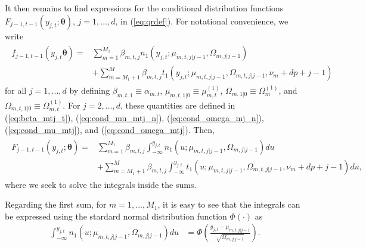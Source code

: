 \documentclass[nojss]{jss}
\begin{document}
\begin{appendix}
It then remains to find expressions for the conditional distribution functions $F_{j-1,t-1}(y_{j,t};\boldsymbol{\theta})$, $j=1,...,d$, in (\ref{eq:qrdef}).  For notational convenience, we write
\begin{align}
\begin{aligned}
f_{j-1,t-1}(y_{j,t}\boldsymbol{\theta}) =& \sum_{m=1}^{M_1}\beta_{m,t,j}n_1(y_{j,t};\mu_{m,t,j|j-1},\Omega_{m,j|j-1}) \\
&+ \sum_{m=M_1 + 1}^{M}\beta_{m,t,j}t_1(y_{j,t};\mu_{m,t,j|j-1},\Omega_{m,t,j|j-1},\nu_m + dp + j - 1)
\end{aligned}
\end{align}
for all $j=1,...,d$ by defining $\beta_{m,t,1}\equiv \alpha_{m,t}$,  $\mu_{m,t,1|0}\equiv \mu_{m,t}^{(1)}$,  $\Omega_{m,1|0}\equiv \Omega_{m}^{(1)}$, and $\Omega_{m,t,1|0}\equiv \Omega_{m,t}^{(1)}$.  For $j=2,...,d$,  these quantities are defined in (\ref{eq:beta_mtj_t}), (\ref{eq:cond_mu_mtj_n}), (\ref{eq:cond_omega_mj_n}), (\ref{eq:cond_mu_mtj}), and (\ref{eq:cond_omega_mtj}). Then,
\begin{align}
\begin{aligned}
F_{j-1,t-1}(y_{j,t};\boldsymbol{\theta})=&\sum_{m=1}^{M_1}\beta_{m,t,j}\int_{-\infty}^{y_{j,t}}n_1(u;\mu_{m,t,j|j-1},\Omega_{m,j|j-1})du \\
&+\sum_{m=M_1+1}^{M}\beta_{m,t,j}\int_{-\infty}^{y_{j,t}}t_1(u;\mu_{m,t,j|j-1},\Omega_{m,t,j|j-1},\nu_m + dp + j - 1)du,
\end{aligned}
\end{align}
where we seek to solve the integrals inside the sums.

Regarding the first sum,  for $m=1,...,M_1$,  it is easy to see that the integrals can be expressed using the stardard normal distribution function $\Phi(\cdot)$ as
\begin{align}
\int_{-\infty}^{y_{j,t}}n_1(u;\mu_{m,t,j|j-1},\Omega_{m,j|j-1})du &= \Phi\left(\frac{y_{j,t}-\mu_{m,t,j|j-1}}{\sqrt{\Omega_{m,j|j-1}}}\right).
\end{align}


\end{appendix}
\end{document}
